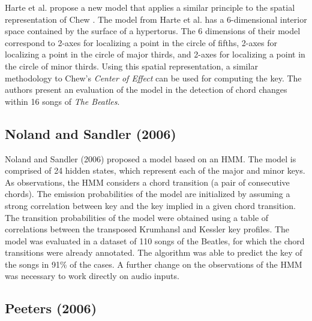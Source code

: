 Harte et al. \cite{harte_detecting_2006} propose a new model that applies a similar principle to the spatial representation of Chew \cite{chew_towards_2000}. The model from Harte et al. has a 6-dimensional interior space contained by the surface of a hypertorus. The 6 dimensions of their model correspond to 2-axes for localizing a point in the circle of fifths, 2-axes for localizing a point in the circle of major thirds, and 2-axes for localizing a point in the circle of minor thirds. Using this spatial representation, a similar methodology to Chew's \emph{Center of Effect} can be used for computing the key. The authors present an evaluation of the model in the detection of chord changes within 16 songs of \emph{The Beatles}.



\subsection{Noland and Sandler (2006)}
Noland and Sandler (2006) proposed a model based on an HMM. The model is comprised of 24 hidden states, which represent each of the major and minor keys. As observations, the HMM considers a chord transition (a pair of consecutive chords). The emission probabilities of the model are initialized by assuming a strong correlation between key and the key implied in a given chord transition. The transition probabilities of the model were obtained using a table of correlations between the transposed Krumhansl and Kessler key profiles. The model was evaluated in a dataset of 110 songs of the Beatles, for which the chord transitions were already annotated. The algorithm was able to predict the key of the songs in 91\% of the cases. A further change on the observations of the HMM was necessary to work directly on audio inputs.

\subsection{Peeters (2006)}

